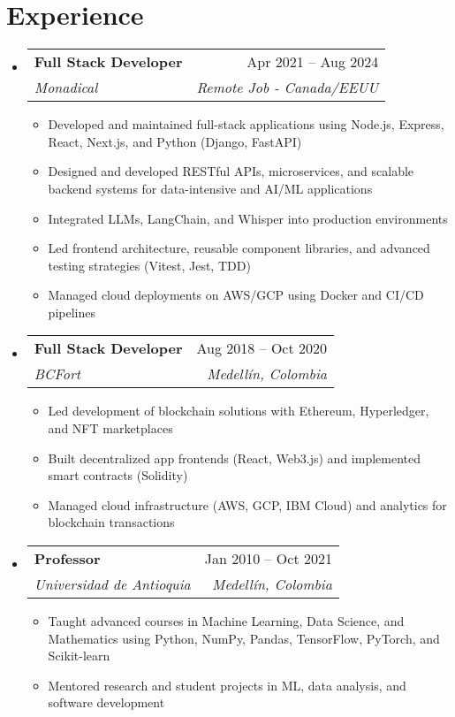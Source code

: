 \documentclass[letterpaper,11pt]{article}
\makeatletter
\newcommand{\resumeSubheading}[4]{
  \vspace{-2pt}
  \item[]
  \begin{tabular*}{\textwidth}{@{\extracolsep{\fill}}l r}
    \textbf{#1} & #2 \\
    \textit{#3} & \textit{#4} \\
  \end{tabular*}
  \vspace{-5pt}
}
\makeatother
\begin{document}
\section{Experience}
\begin{itemize}[leftmargin=0pt, itemindent=0pt, label={}]
\resumeSubheading
{Full Stack Developer}{Apr 2021 -- Aug 2024}
{Monadical}{Remote Job - Canada/EEUU}
\begin{itemize}[leftmargin=*]
    \item Developed and maintained full-stack applications using Node.js, Express, React, Next.js, and Python (Django, FastAPI)
    \item Designed and developed RESTful APIs, microservices, and scalable backend systems for data-intensive and AI/ML applications
    \item Integrated LLMs, LangChain, and Whisper into production environments
    \item Led frontend architecture, reusable component libraries, and advanced testing strategies (Vitest, Jest, TDD)
    \item Managed cloud deployments on AWS/GCP using Docker and CI/CD pipelines
\end{itemize}

\resumeSubheading
{Full Stack Developer}{Aug 2018 -- Oct 2020}
{BCFort}{Medellín, Colombia}
\begin{itemize}[leftmargin=*]
    \item Led development of blockchain solutions with Ethereum, Hyperledger, and NFT marketplaces
    \item Built decentralized app frontends (React, Web3.js) and implemented smart contracts (Solidity)
    \item Managed cloud infrastructure (AWS, GCP, IBM Cloud) and analytics for blockchain transactions
\end{itemize}

\resumeSubheading
{Professor}{Jan 2010 -- Oct 2021}
{Universidad de Antioquia}{Medellín, Colombia}
\begin{itemize}[leftmargin=*]
    \item Taught advanced courses in Machine Learning, Data Science, and Mathematics using Python, NumPy, Pandas, TensorFlow, PyTorch, and Scikit-learn
    \item Mentored research and student projects in ML, data analysis, and software development
\end{itemize}


\end{itemize}
\end{document}
